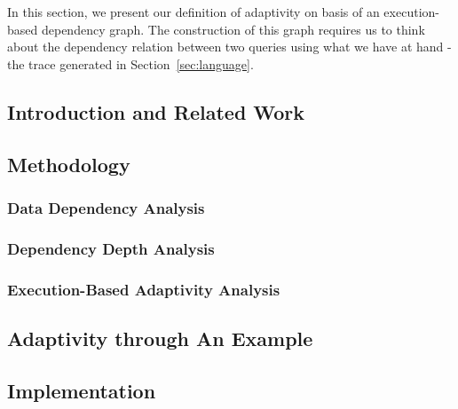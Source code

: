 
In this section, we present our definition of adaptivity on basis of an execution-based dependency graph. 
The construction of this graph requires us to think about the dependency relation between two queries using what we have at hand - 
the trace generated in Section~\ref{sec:language}. 

\subsection{Introduction and Related Work}
\label{subsec:dynamic-intro}


\subsection{Methodology}
\label{subsec:dynamic-methodology}

\subsubsection{Data Dependency Analysis}
\label{subsubsec:dynamic-datadep}

\subsubsection{ Dependency Depth Analysis}
\label{subsubsec:dynamic-reachability}
%
\subsubsection{Execution-Based Adaptivity Analysis}
\label{subsubsec:dynamic-adapt}
%
%
\subsection{Adaptivity through An Example}
\label{subsec:dynamic-examples}

%

% 
%
\subsection{Implementation}
\label{subsec:dynamic-implementation}
%
